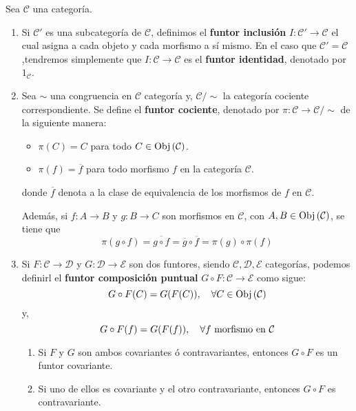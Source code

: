 \documentclass[12pt]{report}
\newcounter{it}
\theoremstyle{largebreak}
\newcommand\cf[3]{\ensuremath{#1:#2\rightarrow#3}}
\newcommand{\Obj}[1]{\ensuremath{\textup{Obj}\left(#1\right)}}
\begin{document}
    \begin{mydef}
        Sea $\mathcal{C}$ una categoría.
        \begin{enumerate}
            \item Si $\mathcal{C}'$ es una subcategoría de $\mathcal{C}$, definimos el \textbf{funtor inclusión} $\cf{I}{\mathcal{C}'}{\mathcal{C}}$ el cual asigna a cada objeto y cada morfismo a sí mismo. En el caso que $\mathcal{C}'=\mathcal{C}$ ,tendremos simplemente que $\cf{I}{\mathcal{C}}{\mathcal{C}}$ es el \textbf{funtor identidad}, denotado por $1_{\mathcal{C}}$.
            \item Sea $\sim$ una congruencia en $\mathcal{C}$ categoría y, $\mathcal{C}/\sim$ la categoría cociente correspondiente. Se define el \textbf{funtor cociente}, denotado por $\cf{\pi}{\mathcal{C}}{\mathcal{C}/\sim}$ de la siguiente manera:
            \begin{itemize}
                \item $\pi(C)=C$ para todo $C\in\Obj{\mathcal{C}}$.
                \item $\pi(f)=\overline{f}$ para todo morfismo $f$ en la categoría $\mathcal{C}$.
            \end{itemize}
            donde $\overline{f}$ denota a la clase de equivalencia de los morfismos de $f$ en $\mathcal{C}$.

            Además, si $\cf{f}{A}{B}$ y $\cf{g}{B}{C}$ son morfismos en $\mathcal{C}$, con $A,B\in\Obj{\mathcal{C}}$, se tiene que
            \begin{equation*}
                \pi(g\circ f)=\overline{g\circ f}=\overline{g}\circ\overline{f}=\pi(g)\circ\pi(f)
            \end{equation*}
            \item Si $\cf{F}{\mathcal{C}}{\mathcal{D}}$ y $\cf{G}{\mathcal{D}}{\mathcal{E}}$ son dos funtores, siendo $\mathcal{C},\mathcal{D},\mathcal{E}$ categorías, podemos definirl el \textbf{funtor composición puntual} $\cf{G\circ F}{\mathcal{C}}{\mathcal{E}}$ como sigue:
            \begin{equation*}
                G\circ F(C)=G(F(C)),\quad\forall C\in\Obj{\mathcal{C}}
            \end{equation*}
            y,
            \begin{equation*}
                G\circ F(f)=G(F(f)),\quad\forall f\textup{ morfismo en }\mathcal{C}
            \end{equation*}
            \begin{enumerate}
                \item Si $F$ y $G$ son ambos covariantes ó contravariantes, entonces $G\circ F$ es un funtor covariante.
                \item Si uno de ellos es covariante y el otro contravariante, entonces $G\circ F$ es contravariante. 
            \end{enumerate}
        \end{enumerate}
    \end{mydef}
\end{document}
